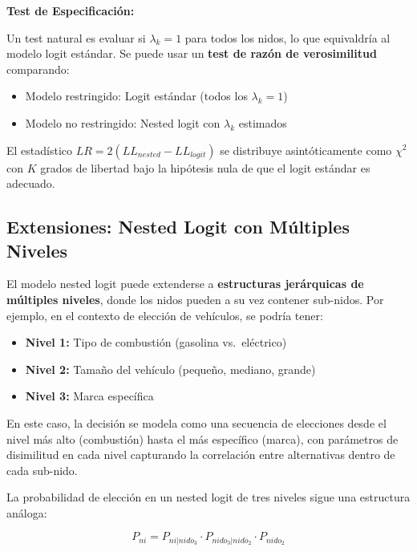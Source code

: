 \documentclass[
]{book}
\providecommand{\tightlist}{%
  \setlength{\itemsep}{0pt}\setlength{\parskip}{0pt}}
\begin{document}
\textbf{Test de Especificación:}

Un test natural es evaluar si \(\lambda_k = 1\) para todos los nidos, lo que equivaldría al modelo logit estándar. Se puede usar un \textbf{test de razón de verosimilitud} comparando:

\begin{itemize}
\tightlist
\item
  Modelo restringido: Logit estándar (todos los \(\lambda_k = 1\))
\item
  Modelo no restringido: Nested logit con \(\lambda_k\) estimados
\end{itemize}

El estadístico \(LR = 2(LL_{nested} - LL_{logit})\) se distribuye asintóticamente como \(\chi^2\) con \(K\) grados de libertad bajo la hipótesis nula de que el logit estándar es adecuado.

\hypertarget{extensiones-nested-logit-con-muxfaltiples-niveles}{%
\subsection{Extensiones: Nested Logit con Múltiples Niveles}\label{extensiones-nested-logit-con-muxfaltiples-niveles}}

El modelo nested logit puede extenderse a \textbf{estructuras jerárquicas de múltiples niveles}, donde los nidos pueden a su vez contener sub-nidos. Por ejemplo, en el contexto de elección de vehículos, se podría tener:

\begin{itemize}
\tightlist
\item
  \textbf{Nivel 1:} Tipo de combustión (gasolina vs.~eléctrico)
\item
  \textbf{Nivel 2:} Tamaño del vehículo (pequeño, mediano, grande)
\item
  \textbf{Nivel 3:} Marca específica
\end{itemize}

En este caso, la decisión se modela como una secuencia de elecciones desde el nivel más alto (combustión) hasta el más específico (marca), con parámetros de disimilitud en cada nivel capturando la correlación entre alternativas dentro de cada sub-nido.

La probabilidad de elección en un nested logit de tres niveles sigue una estructura análoga:

\begin{equation}
P_{ni} = P_{ni|nido_3} \cdot P_{nido_3|nido_2} \cdot P_{nido_2}
\label{eq:threelevel}
\end{equation}
\end{document}
